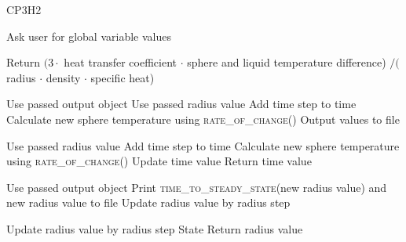 \documentclass[letterpaper,11pt]{texMemo} %
\begin{document}
\begin{algorithm}[H]
      \caption{CP3H2}\label{2}
      \begin{algorithmic}[1]
      \end{algorithmic}
      \begin{algorithmic}[1]
          \State Ask user for global variable values
      \end{algorithmic}
      \begin{algorithmic}[1]
          \State Return $(3\cdot$ heat transfer coefficient $\cdot$ sphere and liquid temperature difference) $ / ($radius $\cdot$ density $\cdot$ specific heat)
      \end{algorithmic}
      \begin{algorithmic}[1]
          \State Use passed output object
          \State Use passed radius value
          \Do 
            \State Add time step to time
            \State Calculate new sphere temperature using \textsc{rate\_of\_change()}
            \State Output values to file
      \end{algorithmic}
      \begin{algorithmic}[1]
          \State Use passed radius value
          \Do 
            \State Add time step to time
            \State Calculate new sphere temperature using \textsc{rate\_of\_change()}
          \State Update time value
          \State Return time value
      \end{algorithmic}
      \begin{algorithmic}[1]
        \State Use passed output object
          \State Print \textsc{time\_to\_steady\_state}(new radius value) and new radius value to file
          \State Update radius value by radius step
      \end{algorithmic}
      \begin{algorithmic}[1]
          \State Update radius value by radius step
        State Return radius value
      \end{algorithmic}
\end{algorithm}
\end{document}
